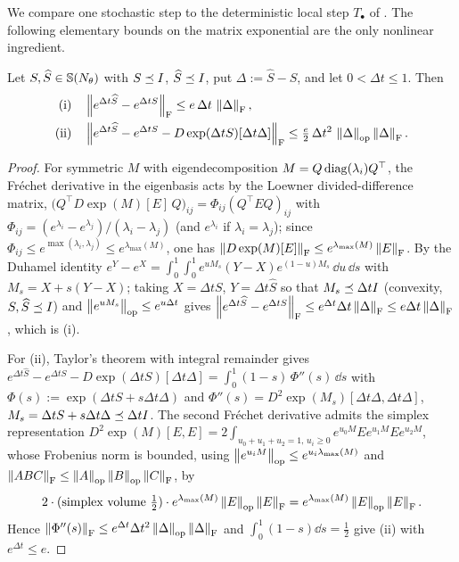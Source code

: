 We compare one stochastic step to the deterministic local step $T_\bullet$ of .
The following elementary bounds on the matrix exponential are the only nonlinear ingredient.

\begin{lemma}
\label{lem:exp-perturb}
Let $S,\widehat S\in\mathbb{S}(N_\theta)$ with $S\preceq I$, $\widehat S\preceq I$, put
$\Delta:=\widehat S-S$, and let $0<\Delta t\leq1$. Then
\begin{align*}
\textup{(i)}\quad & \left\lVert e^{\Delta t\widehat S}-e^{\Delta tS}\right\rVert_{\mathrm{F}}\leq e\,\Delta t\,\left\lVert \Delta\right\rVert_{\mathrm{F}},\\
\textup{(ii)}\quad & \left\lVert e^{\Delta t\widehat S}-e^{\Delta tS}-D\exp(\Delta tS)[\Delta t\Delta]\right\rVert_{\mathrm{F}}
\leq\tfrac{e}{2}\,\Delta t^2\,\left\lVert \Delta\right\rVert_{\mathrm{op}}\left\lVert \Delta\right\rVert_{\mathrm{F}}.
\end{align*}
\end{lemma}

\begin{proof}
For symmetric $M$ with eigendecomposition $M=Q\operatorname{diag}(\lambda_i)Q^\top$, the Fr\'echet derivative in
the eigenbasis acts by the Loewner divided-difference matrix,
$\bigl(Q^\top D\exp(M)[E]\,Q\bigr)_{ij}=\Phi_{ij}(Q^\top EQ)_{ij}$ with
$\Phi_{ij}=(e^{\lambda_i}-e^{\lambda_j})/(\lambda_i-\lambda_j)$ (and $e^{\lambda_i}$ if $\lambda_i=\lambda_j$);
since $\Phi_{ij}\leq e^{\max(\lambda_i,\lambda_j)}\leq e^{\lambda_{\max}(M)}$, one has
$\left\lVert D\exp(M)[E]\right\rVert_{\mathrm{F}}\leq e^{\lambda_{\max}(M)}\left\lVert E\right\rVert_{\mathrm{F}}$. By the Duhamel identity
$e^{Y}-e^{X}=\int_0^1\!\!\int_0^1 e^{u M_s}(Y-X)e^{(1-u)M_s}\,\dd u\,\dd s$ with $M_s=X+s(Y-X)$; taking
$X=\Delta tS$, $Y=\Delta t\widehat S$ so that $M_s\preceq\Delta tI$ (convexity, $S,\widehat S\preceq I$)
and $\left\lVert e^{uM_s}\right\rVert_{\mathrm{op}}\leq e^{u\Delta t}$ gives
$\left\lVert e^{\Delta t\widehat S}-e^{\Delta tS}\right\rVert_{\mathrm{F}}\leq e^{\Delta t}\Delta t\left\lVert \Delta\right\rVert_{\mathrm{F}}\leq e\Delta t\left\lVert \Delta\right\rVert_{\mathrm{F}}$,
which is (i).

For (ii), Taylor's theorem with integral remainder gives
$e^{\Delta t\widehat S}-e^{\Delta tS}-D\exp(\Delta tS)[\Delta t\Delta]=\int_0^1(1-s)\,\Phi''(s)\,\dd s$
with $\Phi(s):=\exp(\Delta tS+s\Delta t\Delta)$ and $\Phi''(s)=D^2\exp(M_s)[\Delta t\Delta,\Delta t\Delta]$,
$M_s=\Delta tS+s\Delta t\Delta\preceq\Delta tI$. The second Fr\'echet derivative admits the simplex
representation $D^2\exp(M)[E,E]=2\!\int_{u_0+u_1+u_2=1,\,u_i\geq0}e^{u_0M}Ee^{u_1M}Ee^{u_2M}$, whose
Frobenius norm is bounded, using $\left\lVert e^{u_iM}\right\rVert_{\mathrm{op}}\leq e^{u_i\lambda_{\max}(M)}$ and
$\left\lVert ABC\right\rVert_{\mathrm{F}}\leq\left\lVert A\right\rVert_{\mathrm{op}}\left\lVert B\right\rVert_{\mathrm{op}}\left\lVert C\right\rVert_{\mathrm{F}}$, by
\[
    2\cdot(\text{simplex volume }\tfrac12)\cdot e^{\lambda_{\max}(M)}\left\lVert E\right\rVert_{\mathrm{op}}\left\lVert E\right\rVert_{\mathrm{F}}
    =e^{\lambda_{\max}(M)}\left\lVert E\right\rVert_{\mathrm{op}}\left\lVert E\right\rVert_{\mathrm{F}}.
\]
Hence
$\left\lVert \Phi''(s)\right\rVert_{\mathrm{F}}\leq e^{\Delta t}\Delta t^2\left\lVert \Delta\right\rVert_{\mathrm{op}}\left\lVert \Delta\right\rVert_{\mathrm{F}}$ and
$\int_0^1(1-s)\dd s=\tfrac12$ give (ii) with $e^{\Delta t}\leq e$.
\end{proof}

